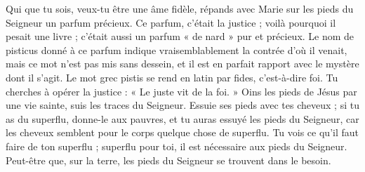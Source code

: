 Qui que tu sois, veux-tu être une âme fidèle, répands avec Marie sur les pieds du Seigneur un parfum précieux. Ce parfum, c’était la justice ; voilà pourquoi il pesait une livre ; c’était aussi un parfum « de nard » pur et précieux. Le nom de pisticus donné à ce parfum indique vraisemblablement la contrée d’où il venait, mais ce mot n’est pas mis sans dessein, et il est en parfait rapport avec le mystère dont il s’agit. Le mot grec pistis se rend en latin par fides, c’est-à-dire foi. Tu cherches à opérer la justice : « Le juste vit de la foi. » Oins les pieds de Jésus par une vie sainte, suis les traces du Seigneur. Essuie ses pieds avec tes cheveux ; si tu as du superflu, donne-le aux pauvres, et tu auras essuyé les pieds du Seigneur, car les cheveux semblent pour le corps quelque chose de superflu. Tu vois ce qu’il faut faire de ton superflu ; superflu pour toi, il est nécessaire aux pieds du Seigneur. Peut-être que, sur la terre, les pieds du Seigneur se trouvent dans le besoin.
